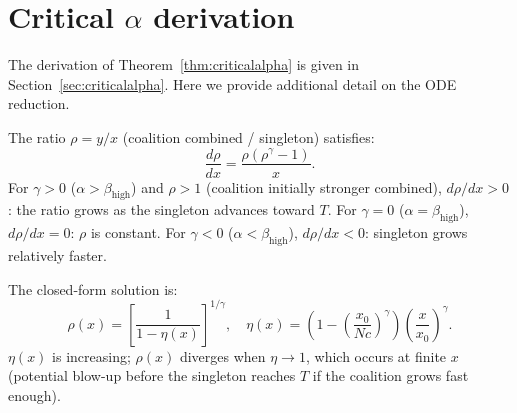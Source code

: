 \documentclass[11pt,letterpaper]{article}
\theoremstyle{plain}
\theoremstyle{definition}
\theoremstyle{remark}
\newcommand{\betaH}{\beta_{\mathrm{high}}}
\begin{document}
\section{Critical $\alpha$ derivation}
\label{app:criticalalpha}

The derivation of Theorem~\ref{thm:criticalalpha} is given in
Section~\ref{sec:criticalalpha}.
Here we provide additional detail on the ODE reduction.

The ratio $\rho = y/x$ (coalition combined / singleton) satisfies:
\[
  \frac{d\rho}{dx} = \frac{\rho(\rho^\gamma - 1)}{x}.
\]
For $\gamma > 0$ ($\alpha > \betaH$) and $\rho > 1$ (coalition initially
stronger combined), $d\rho/dx > 0$: the ratio grows as the singleton
advances toward $T$.
For $\gamma = 0$ ($\alpha = \betaH$), $d\rho/dx = 0$: $\rho$ is constant.
For $\gamma < 0$ ($\alpha < \betaH$), $d\rho/dx < 0$: singleton grows
relatively faster.

The closed-form solution is:
\[
  \rho(x) = \left[\frac{1}{1 - \eta(x)}\right]^{1/\gamma},
  \quad
  \eta(x) = \left(1 - \left(\frac{x_0}{Nc}\right)^\gamma\right)
            \left(\frac{x}{x_0}\right)^\gamma.
\]
$\eta(x)$ is increasing; $\rho(x)$ diverges when $\eta \to 1$, which occurs
at finite $x$ (potential blow-up before the singleton reaches $T$ if the
coalition grows fast enough).
\end{document}
